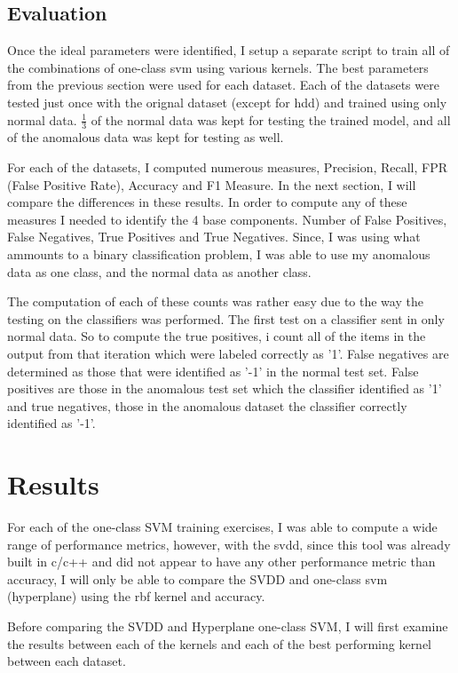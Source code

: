 \documentclass[journal]{IEEEtran}
\begin{document}
\subsection{Evaluation}
Once the ideal parameters were identified, I setup a separate script to train all of the combinations of one-class svm using various kernels. The best parameters from the previous section were used for each dataset. Each of the datasets were tested just once with the orignal dataset (except for hdd) and trained using only normal data. $\frac{1}{3}$ of the normal data was kept for testing the trained model, and all of the anomalous data was kept for testing as well.

For each of the datasets, I computed numerous measures, Precision, Recall, FPR (False Positive Rate), Accuracy and F1 Measure. In the next section, I will compare the differences in these results. In order to compute any of these measures I needed to identify the 4 base components. Number of False Positives, False Negatives, True Positives and True Negatives. Since, I was using what ammounts to a binary classification problem, I was able to use my anomalous data as one class, and the normal data as another class.

The computation of each of these counts was rather easy due to the way the testing on the classifiers was performed. The first test on a classifier sent in only normal data. So to compute the true positives, i count all of the items in the output from that iteration which were labeled correctly as '1'. False negatives are determined as those that were identified as '-1' in the normal test set. False positives are those in the anomalous test set which the classifier identified as '1' and true negatives, those in the anomalous dataset the classifier correctly identified as '-1'.

\section{Results}
For each of the one-class SVM training exercises, I was able to compute a wide range of performance metrics, however, with the svdd, since this tool was already built in c/c++ and did not appear to have any other performance metric than accuracy, I will only be able to compare the SVDD and one-class svm (hyperplane) using the rbf kernel and accuracy.

Before comparing the SVDD and Hyperplane one-class SVM, I will first examine the results between each of the kernels and each of the best performing kernel between each dataset.
\end{document}
